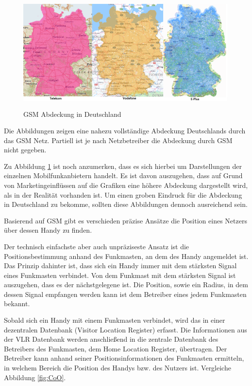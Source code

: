 \begin{figure}[h]
\centering
\includegraphics[width=0.99\textwidth]{ref/images/GSM.PNG}
\caption[GSM Abdeckung in Deutschland]{GSM Abdeckung in Deutschland}
\label{fig:GSM}
\cite{Telekom} \cite{Vodafone} \cite{Eplus}
\end{figure}

Die Abbildungen zeigen eine nahezu vollständige Abdeckung Deutschlands durch das GSM Netz. Partiell ist je nach Netzbetreiber die Abdeckung durch GSM nicht gegeben.

Zu Abbildung \ref{fig:GSM} ist noch anzumerken, dass es sich hierbei um Darstellungen der einzelnen Mobilfunkanbietern handelt. Es ist davon auszugehen, dass auf Grund von Marketingeinflüssen auf die Grafiken eine höhere Abdeckung dargestellt wird, als in der Realität vorhanden ist. Um einen groben Eindruck für die Abdeckung in Deutschland zu bekomme, sollten diese Abbildungen dennoch ausreichend sein.


Basierend auf GSM gibt es verschieden präzise Ansätze die Position eines Netzers über dessen Handy zu finden.


Der technisch einfachste aber auch unpräziseste Ansatz ist die Positionsbestimmung anhand des Funkmasten, an dem des Handy angemeldet ist. Das Prinzip dahinter ist, dass sich ein Handy immer mit dem stärksten Signal eines Funkmasten verbindet. Von dem Funkmast mit dem stärksten Signal ist auszugehen, dass es der nächstgelegene ist. Die Position, sowie ein Radius, in dem dessen Signal empfangen werden kann ist dem Betreiber eines jedem Funkmasten bekannt. 

Sobald sich ein Handy mit einem Funkmasten verbindet, wird das in einer dezentralen Datenbank (Visitor Location Register) erfasst. Die Informationen aus der VLR Datenbank werden anschließend in die zentrale Datenbank des Betreibers des Funkmasten, dem Home Location Register, übertragen. Der Betreiber kann anhand seiner Positionsinformationen des Funkmasten ermitteln, in welchem Bereich die Position des Handys bzw. des Nutzers ist. Vergleiche Abbildung \ref{fig:CoO}.

